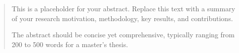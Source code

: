 \documentclass[master]{uos-thesis}
\begin{document}
\makecover

\makesubmission

\makeapproval

\begin{abstract}

This is a placeholder for your abstract. Replace this text with a summary of
your research motivation, methodology, key results, and contributions.

The abstract should be concise yet comprehensive, typically ranging from
200 to 500 words for a master's thesis.

\end{abstract}

\makeinnercover

\frontmatter

\tableofcontents
\clearpage

\listoftables
\clearpage

\listoffigures
\clearpage

\mainmatter


% 
% 
% 

\end{document}
